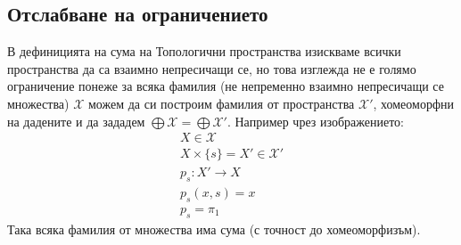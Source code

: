 \subsection{Отслабване на ограничението}
В дефиницията на сума на Топологични пространства изискваме всички пространства да са взаимно непресичащи се, но това изглежда не е голямо ограничение понеже за всяка фамилия (не непременно взаимно непресичащи се множества) $\mathcal X$ можем да си построим фамилия от пространства $\mathcal X'$, хомеоморфни на дадените и да зададем $\bigoplus \mathcal X = \bigoplus \mathcal X'$. Например чрез изображението:
\begin{equation}
    \begin{split}
        X \in \mathcal X                    \\
        X \times \{s\} = X' \in \mathcal X' \\
        p_s : X' \to X                      \\
        p_s(x, s) = x                       \\
        p_s = \pi_1
    \end{split}
\end{equation}
Така всяка фамилия от множества има сума (с точност до хомеоморфизъм).